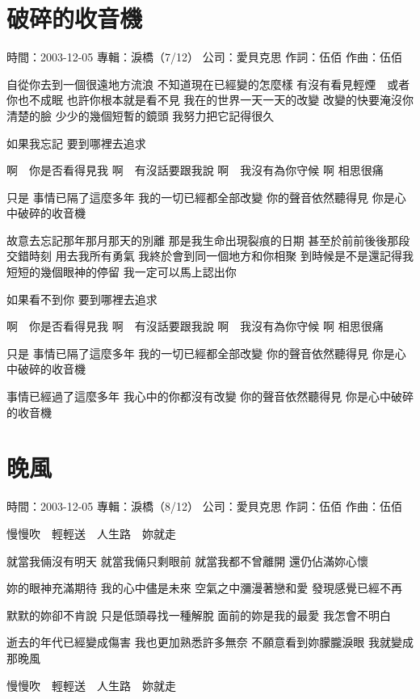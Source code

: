\documentclass[UTF8,a4paper,oneside,twocolumn,12pt]{ctexbook}
\newcommand{\infopair}[2]{\textbullet #1：#2}
\newcommand{\zc}[1][伍佰]{\infopair{作詞}{#1}}
\newcommand{\zq}[1][伍佰]{\infopair{作曲}{#1}}
\newcommand{\zj}[1]{\infopair{專輯}{#1}}
\newcommand{\sj}[1]{\infopair{時間}{#1}}
\newcommand{\gs}[1]{\infopair{公司}{#1}}
\newenvironment{info}{\begin{flushleft}\kaishu
	}
	{\end{flushleft}\normalsize\yahei\par}
\newenvironment{lyric}{
	}
{}
\begin{document}
\section{破碎的收音機}
\begin{info}
	\sj{2003-12-05}
	\zj{淚橋（7/12）}
	\gs{愛貝克思}
	\zc
	\zq
\end{info}
\begin{lyric}
	自從你去到一個很遠地方流浪
	不知道現在已經變的怎麼樣
	有沒有看見輕煙　或者你也不成眠
	也許你根本就是看不見
	我在的世界一天一天的改變
	改變的快要淹沒你清楚的臉
	少少的幾個短暫的鏡頭
	我努力把它記得很久

	如果我忘記 要到哪裡去追求

	啊　你是否看得見我
	啊　有沒話要跟我說
	啊　我沒有為你守候
	啊 相思很痛

	只是
	事情已隔了這麼多年
	我的一切已經都全部改變
	你的聲音依然聽得見
	你是心中破碎的收音機

	故意去忘記那年那月那天的別離
	那是我生命出現裂痕的日期
	甚至於前前後後那段交錯時刻
	用去我所有勇氣
	我終於會到同一個地方和你相聚
	到時候是不是還記得我
	短短的幾個眼神的停留
	我一定可以馬上認出你

	如果看不到你 要到哪裡去追求

	啊　你是否看得見我
	啊　有沒話要跟我說
	啊　我沒有為你守候
	啊 相思很痛

	只是
	事情已隔了這麼多年
	我的一切已經都全部改變
	你的聲音依然聽得見
	你是心中破碎的收音機

	事情已經過了這麼多年
	我心中的你都沒有改變
	你的聲音依然聽得見
	你是心中破碎的收音機
\end{lyric}

\section{晚風}
\begin{info}
	\sj{2003-12-05}
	\zj{淚橋（8/12）}
	\gs{愛貝克思}
	\zc
	\zq
\end{info}
\begin{lyric}
	慢慢吹　輕輕送　人生路　妳就走

	就當我倆沒有明天
	就當我倆只剩眼前
	就當我都不曾離開
	還仍佔滿妳心懷

	妳的眼神充滿期待
	我的心中儘是未來
	空氣之中瀰漫著戀和愛
	發現感覺已經不再

	默默的妳卻不肯說
	只是低頭尋找一種解脫
	面前的妳是我的最愛
	我怎會不明白

	逝去的年代已經變成傷害
	我也更加熟悉許多無奈
	不願意看到妳朦朧淚眼
	我就變成那晚風

	慢慢吹　輕輕送　人生路　妳就走
\end{lyric}
\end{document}
